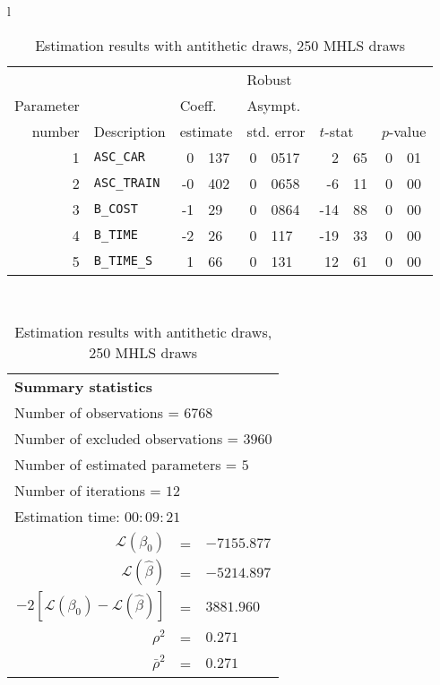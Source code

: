 \documentclass[12pt,a4paper]{article}
\begin{document}
\begin{table}[htb]
  \begin{tabular}{l}
\begin{tabular}{rlr@{.}lr@{.}lr@{.}lr@{.}l}
         &                       &   \multicolumn{2}{l}{}    & \multicolumn{2}{l}{Robust}  &     \multicolumn{4}{l}{}   \\
Parameter &                       &   \multicolumn{2}{l}{Coeff.}      & \multicolumn{2}{l}{Asympt.}  &     \multicolumn{4}{l}{}   \\
number &  Description                     &   \multicolumn{2}{l}{estimate}      & \multicolumn{2}{l}{std. error}  &   \multicolumn{2}{l}{$t$-stat}  &   \multicolumn{2}{l}{$p$-value}   \\

\hline

1 & \lstinline$ASC_CAR$ & 0&137 & 0&0517 & 2&65 & 0&01\\
2 & \lstinline$ASC_TRAIN$ & -0&402 & 0&0658 & -6&11 & 0&00\\
3 & \lstinline$B_COST$ & -1&29 & 0&0864 & -14&88 & 0&00\\
4 & \lstinline$B_TIME$ & -2&26 & 0&117 & -19&33 & 0&00\\
5 & \lstinline$B_TIME_S$ & 1&66 & 0&131 & 12&61 & 0&00\\
\hline
\end{tabular}
\\
\begin{tabular}{rcl}
\multicolumn{3}{l}{\bf Summary statistics}\\
\multicolumn{3}{l}{ Number of observations = $6768$} \\
\multicolumn{3}{l}{ Number of excluded observations = $3960$} \\
\multicolumn{3}{l}{ Number of estimated  parameters = $5$} \\
\multicolumn{3}{l}{ Number of iterations = $12$} \\
\multicolumn{3}{l}{ Estimation time: $00:09:21$} \\
 $\mathcal{L}(\beta_0)$ &=&  $-7155.877$ \\
 $\mathcal{L}(\hat{\beta})$ &=& $-5214.897 $  \\
 $-2[\mathcal{L}(\beta_0) -\mathcal{L}(\hat{\beta})]$ &=& $3881.960$ \\
    $\rho^2$ &=&   $0.271$ \\
    $\bar{\rho}^2$ &=&    $0.271$ \\
\end{tabular}
  \end{tabular}
\caption{\label{tab:estAnti250}Estimation results with antithetic
  draws, 250 MHLS draws}
\end{table}
\end{document}
